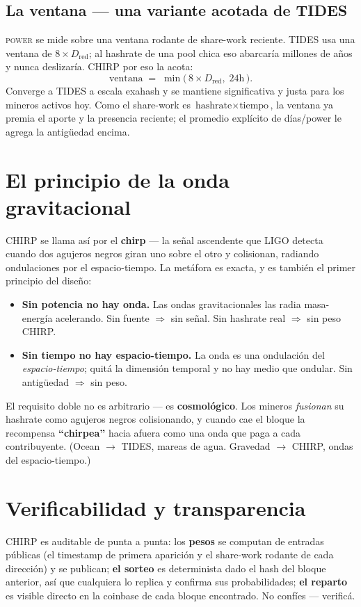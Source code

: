 \documentclass[11pt]{article}
\begin{document}
\subsection{La ventana --- una variante acotada de TIDES}
\textsc{power} se mide sobre una ventana rodante de share-work reciente. TIDES usa una ventana de
$8 \times D_{\text{red}}$; al hashrate de una pool chica eso abarcar\'ia millones de a\~nos y nunca
deslizar\'ia. CHIRP por eso la acota:
\[
  \text{ventana} \;=\; \min\!\big(\,8 \times D_{\text{red}},\; 24\text{h}\,\big).
\]
Converge a TIDES a escala exahash y se mantiene significativa y justa para los mineros activos hoy.
Como el share-work es $\text{hashrate} \times \text{tiempo}$, la ventana ya premia el aporte y la
presencia reciente; el promedio expl\'icito de d\'ias/power le agrega la antig\"uedad encima.

\section{El principio de la onda gravitacional}
CHIRP se llama as\'i por el \textbf{chirp} --- la se\~nal ascendente que LIGO detecta cuando dos
agujeros negros giran uno sobre el otro y colisionan, radiando ondulaciones por el espacio-tiempo.
La met\'afora es exacta, y es tambi\'en el primer principio del dise\~no:
\begin{itemize}[leftmargin=1.4em]
  \item \textbf{Sin potencia no hay onda.} Las ondas gravitacionales las radia masa-energ\'ia
  acelerando. Sin fuente $\Rightarrow$ sin se\~nal. Sin hashrate real $\Rightarrow$ sin peso CHIRP.
  \item \textbf{Sin tiempo no hay espacio-tiempo.} La onda es una ondulaci\'on del \emph{espacio-tiempo};
  quit\'a la dimensi\'on temporal y no hay medio que ondular. Sin antig\"uedad $\Rightarrow$ sin peso.
\end{itemize}
El requisito doble no es arbitrario --- es \textbf{cosmol\'ogico}. Los mineros \emph{fusionan} su
hashrate como agujeros negros colisionando, y cuando cae el bloque la recompensa \textbf{``chirpea''}
hacia afuera como una onda que paga a cada contribuyente. (Ocean $\to$ TIDES, mareas de agua.
Gravedad $\to$ CHIRP, ondas del espacio-tiempo.)

\section{Verificabilidad y transparencia}
CHIRP es auditable de punta a punta: los \textbf{pesos} se computan de entradas p\'ublicas (el
timestamp de primera aparici\'on y el share-work rodante de cada direcci\'on) y se publican; \textbf{el
sorteo} es determinista dado el hash del bloque anterior, as\'i que cualquiera lo replica y confirma
sus probabilidades; \textbf{el reparto} es visible directo en la coinbase de cada bloque encontrado.
No confíes --- verific\'a.
\end{document}
